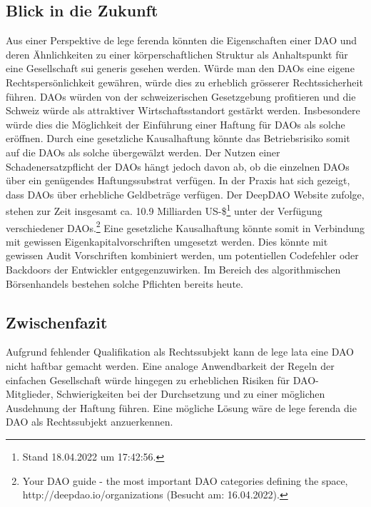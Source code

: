 \documentclass[a4paper,12pt]{report}
\begin{document}
	\subsection{Blick in die Zukunft}
	\startsubsection
	Aus einer Perspektive de lege ferenda könnten die Eigenschaften einer DAO und deren Ähnlichkeiten zu einer körperschaftlichen Struktur als Anhaltspunkt für eine Gesellschaft sui generis gesehen werden. Würde man den DAOs eine eigene Rechtspersönlichkeit gewähren, würde dies zu erheblich grösserer Rechtssicherheit führen. DAOs würden von der schweizerischen Gesetzgebung profitieren und die Schweiz würde als attraktiver Wirtschaftsstandort gestärkt werden. Insbesondere würde dies die Möglichkeit der Einführung einer Haftung für DAOs als solche eröffnen. Durch eine gesetzliche Kausalhaftung könnte das Betriebsrisiko somit auf die DAOs als solche übergewälzt werden. Der Nutzen einer Schadenersatzpflicht der DAOs hängt jedoch davon ab, ob die einzelnen DAOs über ein genügendes Haftungssubstrat verfügen. In der Praxis hat sich gezeigt, dass DAOs über erhebliche Geldbeträge verfügen. Der DeepDAO Website zufolge, stehen zur Zeit insgesamt ca. 10.9 Milliarden US-\$\footnote{\hspace{0.5em}Stand 18.04.2022 um 17:42:56.} unter der Verfügung verschiedener DAOs.\footnote{\hspace{0.5em}\begin{minipage}[t]{13cm}Your DAO guide - the most important DAO categories defining the space, http://deepdao.io/organizations (Besucht am: 16.04.2022).\end{minipage}} Eine gesetzliche Kausalhaftung könnte somit in Verbindung mit gewissen Eigenkapitalvorschriften umgesetzt werden. Dies könnte mit gewissen Audit Vorschriften kombiniert werden, um potentiellen Codefehler oder Backdoors der Entwickler entgegenzuwirken. Im Bereich des algorithmischen Börsenhandels bestehen solche Pflichten bereits heute.
	\closesection
	\subsection{Zwischenfazit}
	\startsubsection
	Aufgrund fehlender Qualifikation als Rechtssubjekt kann de lege lata eine DAO nicht haftbar gemacht werden. Eine analoge Anwendbarkeit der Regeln der einfachen Gesellschaft würde hingegen zu erheblichen Risiken für DAO-Mitglieder, Schwierigkeiten bei der Durchsetzung und zu einer möglichen Ausdehnung der Haftung führen. Eine mögliche Lösung wäre de lege ferenda die DAO als Rechtssubjekt anzuerkennen.
	\closesection
	\closesection
\end{document}
